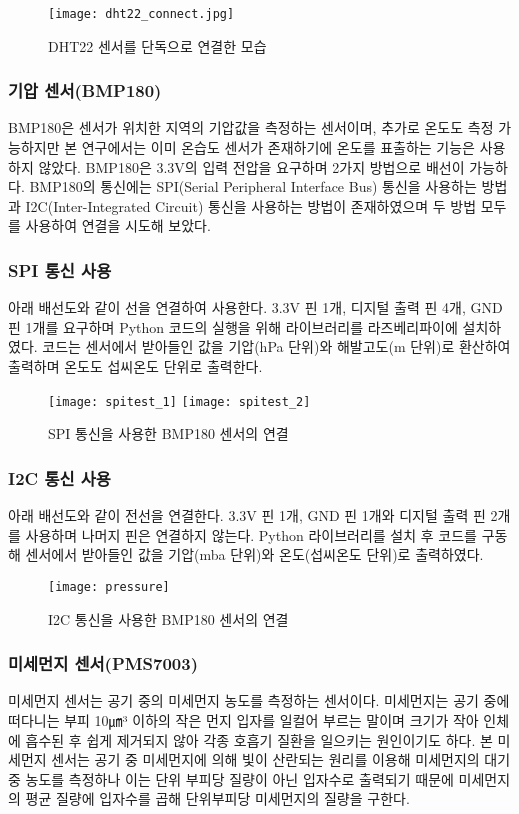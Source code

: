 \begin{figure}[htbp]
	\centering
	\texttt{[image: dht22\_connect.jpg]}
	\caption{DHT22 센서를 단독으로 연결한 모습}
	\label{DHT22}
\end{figure}

\subsubsection{기압 센서(BMP180)}
BMP180은 센서가 위치한 지역의 기압값을 측정하는 센서이며, 추가로 온도도 측정 가능하지만 본 연구에서는 이미 온습도 센서가 존재하기에 온도를 표출하는 기능은 사용하지 않았다. BMP180은 3.3V의 입력 전압을 요구하며 2가지 방법으로 배선이 가능하다. BMP180의 통신에는 SPI(Serial Peripheral Interface Bus) 통신을 사용하는 방법과 I2C(Inter-Integrated Circuit) 통신을 사용하는 방법이 존재하였으며 두 방법 모두를 사용하여 연결을 시도해 보았다.
\subsubsection*{SPI 통신 사용}
아래 배선도와 같이 선을 연결하여 사용한다. 3.3V 핀 1개, 디지털 출력 핀 4개, GND 핀 1개를 요구하며 Python 코드의 실행을 위해 라이브러리를 라즈베리파이에 설치하였다. 코드는 센서에서 받아들인 값을 기압(hPa 단위)와 해발고도(m 단위)로 환산하여 출력하며 온도도 섭씨온도 단위로 출력한다.

\begin{figure}[htbp]
	\centering
	\texttt{[image: spitest\_1]}
	\texttt{[image: spitest\_2]}
	\caption{SPI 통신을 사용한 BMP180 센서의 연결}
	\label{SPI}
\end{figure}

\subsubsection*{I2C 통신 사용}
아래 배선도와 같이 전선을 연결한다. 3.3V 핀 1개, GND 핀 1개와 디지털 출력 핀 2개를 사용하며 나머지 핀은 연결하지 않는다. Python 라이브러리를 설치 후 코드를 구동해 센서에서 받아들인 값을 기압(mba 단위)와 온도(섭씨온도 단위)로 출력하였다.

\begin{figure}[htbp]
	\centering
	\texttt{[image: pressure]}
	\caption{I2C 통신을 사용한 BMP180 센서의 연결}
	\label{I2C}
\end{figure}

\subsubsection{미세먼지 센서(PMS7003)}
미세먼지 센서는 공기 중의 미세먼지 농도를 측정하는 센서이다. 미세먼지는 공기 중에 떠다니는 부피 10㎛³ 이하의 작은 먼지 입자를 일컬어 부르는 말이며 크기가 작아 인체에 흡수된 후 쉽게 제거되지 않아 각종 호흡기 질환을 일으키는 원인이기도 하다. 본 미세먼지 센서는 공기 중 미세먼지에 의해 빛이 산란되는 원리를 이용해 미세먼지의 대기 중 농도를 측정하나 이는 단위 부피당 질량이 아닌 입자수로 출력되기 때문에 미세먼지의 평균 질량에 입자수를 곱해 단위부피당 미세먼지의 질량을 구한다. 

